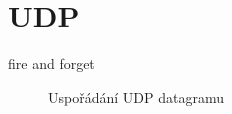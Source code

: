 
\section{UDP}
fire and forget

\begin{figure}[h]
    \centering
	\caption{Uspořádání UDP datagramu}
	\label{fig:tcp-packet}
\end{figure}